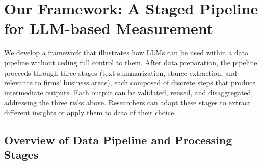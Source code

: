 \documentclass[11pt]{article}
\begin{document}
\section{Our Framework: A Staged Pipeline for LLM-based Measurement}

We develop a framework that illustrates how LLMs can be used within a data pipeline without ceding full control to them. After data preparation, the pipeline proceeds through three stages (text summarization, stance extraction, and relevance to firms' business areas), each composed of discrete steps that produce intermediate outputs. Each output can be validated, reused, and disaggregated, addressing the three risks above. Researchers can adapt these stages to extract different insights or apply them to data of their choice.

\subsection{Overview of Data Pipeline and Processing Stages}
\end{document}
